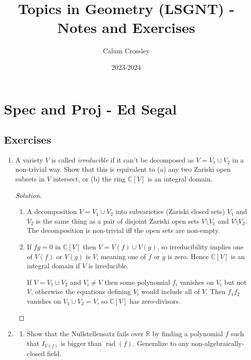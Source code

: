 \documentclass{article}
\title{Topics in Geometry (LSGNT) - Notes and Exercises}
\author{Calum Crossley}
\date{2023-2024}
\theoremstyle{definition}
\DeclareMathOperator{\rad}{rad}
\newcommand{\R}{\mathbb{R}}
\newcommand{\C}{\mathbb{C}}
\begin{document}
\maketitle

\section{Spec and Proj - Ed Segal}

\subsection*{Exercises}

\begin{enumerate}
    \item A variety $V$ is called \emph{irreducible} if it can't be decomposed
        as $V=V_1\cup V_2$ in a non-trivial way. Show that this is equivalent to
        (a) any two Zariski open subsets in $V$ intersect, or (b) the ring
        $\C[V]$ is an integral domain.

        \begin{proof}[Solution]
            \begin{enumerate}[label=(\alph*)]
                \item A decomposition $V=V_1\cup V_2$ into subvarieties (Zariski
                    closed sets) $V_1$ and $V_2$ is the same thing as a pair of
                    disjoint Zariski open sets $V\setminus V_1$ and
                    $V\setminus V_2$. The decomposition is non-trivial iff the
                    open sets are non-empty.

                \item If $fg=0$ in $\C[V]$ then $V=V(f)\cup V(g)$, so
                    irreducibility implies one of $V(f)$ or $V(g)$ is $V$,
                    meaning one of $f$ or $g$ is zero. Hence $\C[V]$ is an
                    integral domain if $V$ is irreducible.

                    If $V=V_1\cup V_2$ and $V_i\ne V$ then some polynomial $f_i$
                    vanishes on $V_i$ but not $V$, otherwise the equations
                    defining $V_i$ would include all of $V$. Then $f_1f_2$
                    vanishes on $V_1\cup V_2=V$, so $\C[V]$ has zero-divisors.
            \end{enumerate}
        \end{proof}

    \item
        \begin{enumerate}[label=(\alph*)]
            \item Show that the Nullstellensatz fails over $\R$ by finding a
                polynomial $f$ such that $I_{V(f)}$ is bigger than $\rad(f)$.
                Generalize to any non-algebraically-closed field.


\end{enumerate}
\end{enumerate}
\end{document}
